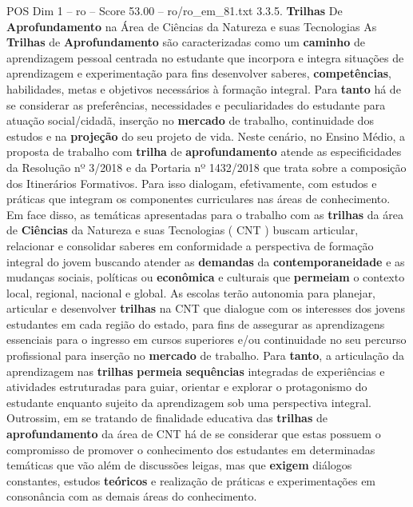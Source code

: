 \begin{textsample}{POS Dim 1 – ro – Score 53.00 – ro/ro\_em\_81.txt}  \label{ex:f1_pos_139}
3.3.5. \textbf{Trilhas} De \textbf{Aprofundamento} na Área de Ciências da Natureza e suas Tecnologias As \textbf{Trilhas} de \textbf{Aprofundamento} são caracterizadas como um \textbf{caminho} de aprendizagem pessoal centrada no estudante que incorpora e integra situações de aprendizagem e experimentação para fins desenvolver saberes, \textbf{competências}, habilidades, metas e objetivos necessários à formação integral.
Para \textbf{tanto} há de se considerar as preferências, necessidades e peculiaridades do estudante para atuação social/cidadã, inserção no \textbf{mercado} de trabalho, continuidade dos estudos e na \textbf{projeção} do seu projeto de vida.
Neste cenário, no Ensino Médio, a proposta de trabalho com \textbf{trilha} de \textbf{aprofundamento} atende as especificidades da Resolução nº 3/2018 e da Portaria nº 1432/2018 que trata sobre a composição dos Itinerários Formativos.
Para isso dialogam, efetivamente, com estudos e práticas que integram os componentes curriculares nas áreas de conhecimento.
Em face disso, as temáticas apresentadas para o trabalho com as \textbf{trilhas} da área de \textbf{Ciências} da Natureza e suas Tecnologias ( CNT ) buscam articular, relacionar e consolidar saberes em conformidade a perspectiva de formação integral do jovem buscando atender as \textbf{demandas} da \textbf{contemporaneidade} e as mudanças sociais, políticas ou \textbf{econômica} e culturais que \textbf{permeiam} o contexto local, regional, nacional e global.
As escolas terão autonomia para planejar, articular e desenvolver \textbf{trilhas} na CNT que dialogue com os interesses dos jovens estudantes em cada região do estado, para fins de assegurar as aprendizagens essenciais para o ingresso em cursos superiores e/ou continuidade no seu percurso profissional para inserção no \textbf{mercado} de trabalho.
Para \textbf{tanto}, a articulação da aprendizagem nas \textbf{trilhas} \textbf{permeia} \textbf{sequências} integradas de experiências e atividades estruturadas para guiar, orientar e explorar o protagonismo do estudante enquanto sujeito da aprendizagem sob uma perspectiva integral.
Outrossim, em se tratando de finalidade educativa das \textbf{trilhas} de \textbf{aprofundamento} da área de CNT há de se considerar que estas possuem o compromisso de promover o conhecimento dos estudantes em determinadas temáticas que vão além de discussões leigas, mas que \textbf{exigem} diálogos constantes, estudos \textbf{teóricos} e realização de práticas e experimentações em consonância com as demais áreas do conhecimento.

\end{textsample}
